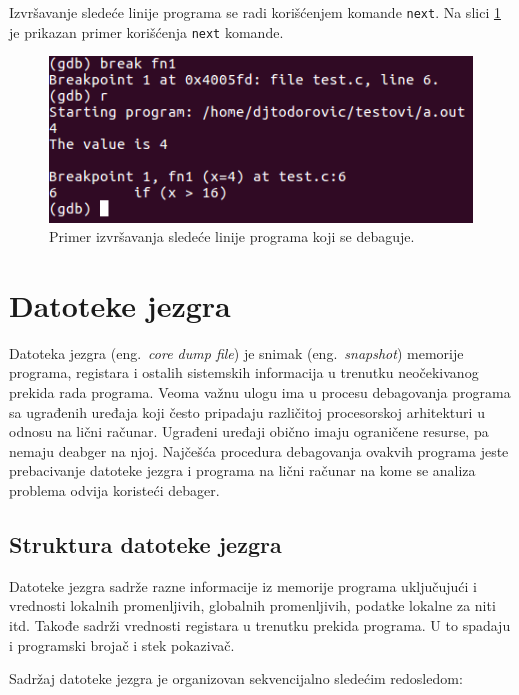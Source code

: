 \documentclass[12pt,oneside]{memoir}
\begin{document}
Izvršavanje sledeće linije programa se radi korišćenjem komande \texttt{next}. Na slici \ref{fig:next} je prikazan primer korišćenja \texttt{next} komande.

\begin{figure}[h!]
	\begin{center}
		\includegraphics[scale=0.5]{slike/break-fn.png}
	\end{center}
	\caption{Primer izvršavanja sledeće linije programa koji se debaguje.}
	\label{fig:next}
\end{figure}

\newpage
\section{Datoteke jezgra}

Datoteka jezgra (eng.~\emph{core dump file}) je snimak (eng.~\emph{snapshot}) memorije programa, registara i ostalih sistemskih informacija u trenutku neočekivanog prekida rada programa. Veoma važnu ulogu ima u procesu debagovanja programa sa ugrađenih uređaja koji često pripadaju različitoj procesorskoj arhitekturi u odnosu na lični računar. Ugrađeni uređaji obično imaju ograničene resurse, pa nemaju deabger na njoj. Najčešća procedura debagovanja ovakvih programa jeste prebacivanje datoteke jezgra i programa na lični računar na kome se analiza problema odvija koristeći debager.

\subsection{Struktura datoteke jezgra}

Datoteke jezgra sadrže razne informacije iz memorije programa uključujući i vrednosti lokalnih promenljivih, globalnih promenljivih, podatke lokalne za niti itd. Takođe sadrži vrednosti registara u trenutku prekida programa. U to spadaju i programski brojač i stek pokazivač.

Sadržaj datoteke jezgra je organizovan sekvencijalno sledećim redosledom:
\end{document}
